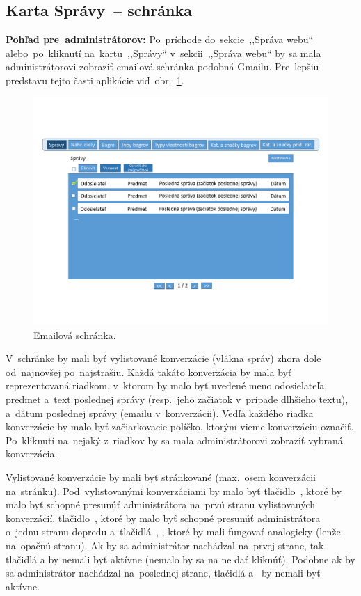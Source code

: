 \subsection{Karta Správy~-- schránka}
\label{karta spravy schranka}

\textbf{Pohľad pre~administrátorov:} Po~príchode do~sekcie~,,Správa webu`` alebo~po~kliknutí na~kartu~,,Správy`` v~sekcii~,,Správa webu`` by sa mala administrátorovi zobraziť emailová schránka podobná Gmailu. Pre~lepšiu predstavu tejto časti aplikácie viď~obr.~\ref{messages}.

\begin{figure}[H]\centering
\includegraphics[width=140mm]{../img/UI concept/messages}
\caption{Emailová schránka.}
\label{messages}
\end{figure}

V~schránke by mali byť vylistované konverzácie (vlákna správ) zhora dole od~najnovšej po~najstrašiu. Každá takáto konverzácia by mala byť reprezentovaná riadkom, v~ktorom by malo byť uvedené meno odosielateľa, predmet a~text poslednej správy (resp.~jeho začiatok v~prípade dlhšieho textu), a~dátum poslednej správy (emailu v~konverzácii). Vedľa každého riadka konverzácie by malo byť začiarkovacie políčko, ktorým vieme konverzáciu označiť. Po~kliknutí na~nejaký z~riadkov by sa mala administrátorovi zobraziť vybraná konverzácia.

Vylistované konverzácie by mali byť stránkované (max.~osem konverzácii na~stránku). Pod~vylistovanými konverzáciami by malo byť tlačidlo~\uv{<<}, ktoré by malo byť schopné presunúť administrátora na~prvú stranu vylistovaných konverzácií, tlačidlo~\uv{<}, ktoré by malo byť schopné presunúť administrátora o~jednu stranu dopredu a~tlačidlá~\uv{>}, \uv{>>}, ktoré by mali fungovať analogicky (lenže na~opačnú stranu). Ak by sa administrátor nachádzal na~prvej strane, tak tlačidlá \uv{<<} a \uv{<} by nemali byť aktívne (nemalo by sa na ne dať kliknúť). Podobne ak by sa administrátor nachádzal na~poslednej strane, tlačidlá \uv{>} a~\uv{>>} by nemali byť aktívne.

